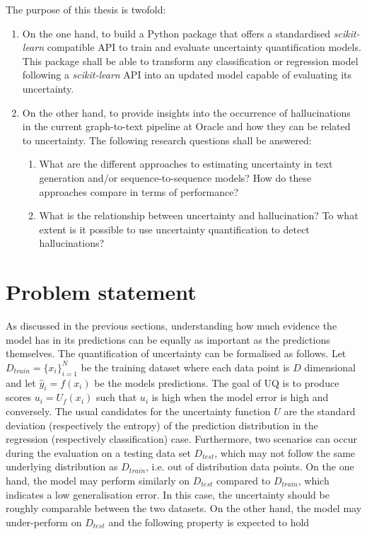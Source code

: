 The purpose of this thesis is twofold:
\begin{enumerate}
    \item On the one hand, to build a Python package that offers a standardised \textit{scikit-learn} compatible API to train and evaluate uncertainty quantification models. This package shall be able to transform any classification or regression model following a \textit{scikit-learn} API into an updated model capable of evaluating its uncertainty.
    \item On the other hand, to provide insights into the occurrence of hallucinations in the current graph-to-text pipeline at Oracle and how they can be related to uncertainty. The following research questions shall be answered:
    \begin{enumerate}
        \item What are the different approaches to estimating uncertainty in text generation and/or sequence-to-sequence models? How do these approaches compare in terms of performance?
        \item What is the relationship between uncertainty and hallucination? To what extent is it possible to use uncertainty quantification to detect hallucinations?
    \end{enumerate}

\end{enumerate}

\section{Problem statement} \label{intro:problem-section}


As discussed in the previous sections, understanding how much evidence the model has in its predictions can be equally as important as the predictions themselves. The quantification of uncertainty can be formalised as follows. Let $D_{train}=\{x_i\}_{i=1}^N$ be the training dataset where each data point is $D$ dimensional and let $\hat y_i = f(x_i)$ be the models predictions. The goal of UQ is to produce scores 
$u_i = U_f(x_i)$
such that $u_i$ is high when the model error is high and conversely. The usual candidates for the uncertainty function $U$ are the standard deviation (respectively the entropy) of the prediction distribution in the regression (respectively classification) case.   
Furthermore, two scenarios can occur during the evaluation on a testing data set $D_{test}$, which may not follow the same underlying distribution as $D_{train}$, i.e. out of distribution data points. On the one hand, the model may perform similarly on $D_{test}$ compared to $D_{train}$, which indicates a low generalisation error. In this case, the uncertainty should be roughly comparable between the two datasets. On the other hand, the model may under-perform on $D_{test}$ and the following property is expected to hold

